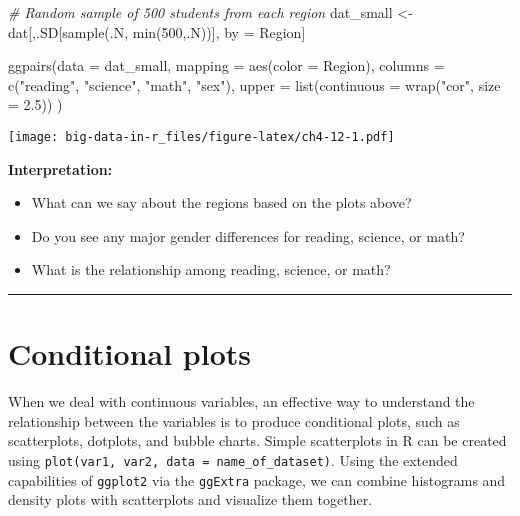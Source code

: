 \documentclass[
]{book}
\newenvironment{Shaded}{\begin{snugshade}}{\end{snugshade}}
\newcommand{\AttributeTok}[1]{\textcolor[rgb]{0.77,0.63,0.00}{#1}}
\newcommand{\CommentTok}[1]{\textcolor[rgb]{0.56,0.35,0.01}{\textit{#1}}}
\newcommand{\DecValTok}[1]{\textcolor[rgb]{0.00,0.00,0.81}{#1}}
\newcommand{\FloatTok}[1]{\textcolor[rgb]{0.00,0.00,0.81}{#1}}
\newcommand{\FunctionTok}[1]{\textcolor[rgb]{0.00,0.00,0.00}{#1}}
\newcommand{\NormalTok}[1]{#1}
\newcommand{\OtherTok}[1]{\textcolor[rgb]{0.56,0.35,0.01}{#1}}
\newcommand{\StringTok}[1]{\textcolor[rgb]{0.31,0.60,0.02}{#1}}
\providecommand{\tightlist}{%
  \setlength{\itemsep}{0pt}\setlength{\parskip}{0pt}}
\begin{document}
\begin{Shaded}
\begin{Highlighting}[]
\CommentTok{\# Random sample of 500 students from each region}
\NormalTok{dat\_small }\OtherTok{\textless{}{-}}\NormalTok{ dat[,.SD[}\FunctionTok{sample}\NormalTok{(.N, }\FunctionTok{min}\NormalTok{(}\DecValTok{500}\NormalTok{,.N))], by }\OtherTok{=}\NormalTok{ Region]}

\FunctionTok{ggpairs}\NormalTok{(}\AttributeTok{data =}\NormalTok{ dat\_small,}
        \AttributeTok{mapping =} \FunctionTok{aes}\NormalTok{(}\AttributeTok{color =}\NormalTok{ Region),}
        \AttributeTok{columns =} \FunctionTok{c}\NormalTok{(}\StringTok{"reading"}\NormalTok{, }\StringTok{"science"}\NormalTok{, }\StringTok{"math"}\NormalTok{, }\StringTok{"sex"}\NormalTok{),}
        \AttributeTok{upper =} \FunctionTok{list}\NormalTok{(}\AttributeTok{continuous =} \FunctionTok{wrap}\NormalTok{(}\StringTok{"cor"}\NormalTok{, }\AttributeTok{size =} \FloatTok{2.5}\NormalTok{))}
\NormalTok{        )}
\end{Highlighting}
\end{Shaded}

\texttt{[image: big-data-in-r\_files/figure-latex/ch4-12-1.pdf]}

\textbf{Interpretation:}

\begin{itemize}
\tightlist
\item
  What can we say about the regions based on the plots above?
\item
  Do you see any major gender differences for reading, science, or math?
\item
  What is the relationship among reading, science, or math?
\end{itemize}

\begin{center}\rule{0.5\linewidth}{0.5pt}\end{center}

\hypertarget{conditional-plots}{%
\section{Conditional plots}\label{conditional-plots}}

When we deal with continuous variables, an effective way to understand the relationship between the variables is to produce conditional plots, such as scatterplots, dotplots, and bubble charts. Simple scatterplots in R can be created using \texttt{plot(var1,\ var2,\ data\ =\ name\_of\_dataset)}. Using the extended capabilities of \texttt{ggplot2} via the \texttt{ggExtra} package, we can combine histograms and density plots with scatterplots and visualize them together.
\end{document}
